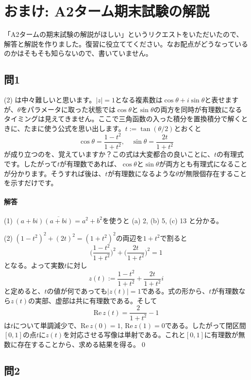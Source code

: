 \section{おまけ: A2ターム期末試験の解説}

「A2タームの期末試験の解説がほしい」というリクエストをいただいたので、解答と解説を作りました。復習に役立ててください。なお配点がどうなっているのかはそもそも知らないので、書いていません。

\subsection{問1}

(2) は中々難しいと思います。$|z| = 1$となる複素数は$\cos\theta + i \sin\theta$と表せますが、$\theta$をパラメータに取った状態では$\cos \theta$と$\sin \theta$の両方を同時が有理数になるタイミングは見えてきません。ここで三角函数の入った積分を置換積分で解くときに、たまに使う公式を思い出します。$t := \tan (\theta/2)$とおくと
\[
\cos \theta = \frac{1 - t^2}{1 + t^2}, \quad \sin \theta = \frac{2t}{1 + t^2}
\]
が成り立つのを、覚えていますか？この式は大変都合の良いことに、$t$の有理式です。したがって$t$が有理数であれば、$\cos \theta$と$\sin \theta$が両方とも有理式になることが分かります。そうすれば後は、$t$が有理数になるような$\theta$が無限個存在することを示すだけです。

\paragraph{解答}
\noindent (1) $(a + bi)\overline{(a + bi)} = a^2 + b^2$を使うと (a) 2, (b) 5, (c) 13 と分かる。

\noindent (2) $(1 - t^2)^2 + (2t)^2 = (1 + t^2)^2$の両辺を$1 + t^2$で割ると
\[
\biggl(\frac{1 - t^2}{1 + t^2}\biggr)^2 + \biggl(\frac{2t}{1 + t^2}\biggr)^2 = 1
\]
となる。よって実数$t$に対し
\[
z(t) := \frac{1 - t^2}{1 + t^2} + \frac{2t}{1 + t^2}i
\]
と定めると、$t$の値が何であっても$|z(t)| = 1$である。式の形から、$t$が有理数なら$z(t)$の実部、虚部は共に有理数である。そして
\[
\mathrm{Re}\, z(t) = \frac{2}{1 + t^2} - 1
\]
は$t$について単調減少で、$\mathrm{Re}\, z(0) = 1$, $\mathrm{Re}\, z(1) = 0$である。したがって閉区間$[0, 1]$の点$t$に$z(t)$を対応させる写像は単射である。これと$[0, 1]$に有理数が無数に存在することから、求める結果を得る。\qed

\subsection{問2}

